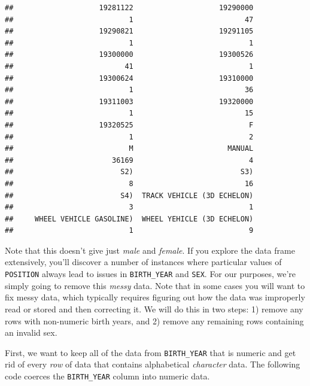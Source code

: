 \documentclass[]{book}
\newenvironment{Shaded}{\begin{snugshade}}{\end{snugshade}}
\newcommand{\KeywordTok}[1]{\textcolor[rgb]{0.13,0.29,0.53}{\textbf{{#1}}}}
\newcommand{\StringTok}[1]{\textcolor[rgb]{0.31,0.60,0.02}{{#1}}}
\newcommand{\NormalTok}[1]{{#1}}
\begin{document}
\begin{verbatim}
##                    19281122                    19290000 
##                           1                          47 
##                    19290821                    19291105 
##                           1                           1 
##                    19300000                    19300526 
##                          41                           1 
##                    19300624                    19310000 
##                           1                          36 
##                    19311003                    19320000 
##                           1                          15 
##                    19320525                           F 
##                           1                           2 
##                           M                      MANUAL 
##                       36169                           4 
##                         S2)                         S3) 
##                           8                          16 
##                         S4)  TRACK VEHICLE (3D ECHELON) 
##                           3                           1 
##     WHEEL VEHICLE GASOLINE)  WHEEL YEHICLE (3D ECHELON) 
##                           1                           9
\end{verbatim}

Note that this doesn't give just \emph{male} and \emph{female}. If you
explore the data frame extensively, you'll discover a number of
instances where particular values of \texttt{POSITION} always lead to
issues in \texttt{BIRTH\_YEAR} and \texttt{SEX}. For our purposes, we're
simply going to remove this \emph{messy} data. Note that in some cases
you will want to fix messy data, which typically requires figuring out
how the data was improperly read or stored and then correcting it. We
will do this in two steps: 1) remove any rows with non-numeric birth
years, and 2) remove any remaining rows containing an invalid sex.

First, we want to keep all of the data from \texttt{BIRTH\_YEAR} that is
numeric and get rid of every \emph{row} of data that contains
alphabetical \emph{character} data. The following code coerces the
\texttt{BIRTH\_YEAR} column into numeric data.

\begin{Shaded}
\end{Shaded}
\end{document}
